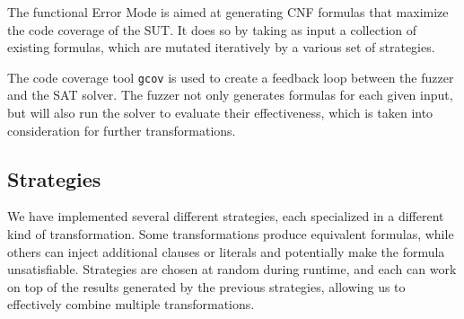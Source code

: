 \documentclass{article}
\begin{document}
The functional Error Mode is aimed at generating CNF formulas that maximize the code coverage of the SUT. 
It does so by taking as input a collection of existing formulas, which are mutated iteratively by a 
various set of strategies.

The code coverage tool \verb|gcov| is used to create a feedback loop between the fuzzer and the SAT solver.
The fuzzer not only generates formulas for each given input, but will also run the solver to evaluate
their effectiveness, which is taken into consideration for further transformations.

\subsection{Strategies}

We have implemented several different strategies, each specialized in a different kind of transformation.
Some transformations produce equivalent formulas, while others can inject additional clauses or literals
and potentially make the formula unsatisfiable.
Strategies are chosen at random during runtime, and each can work on top of the results generated by the
previous strategies, allowing us to effectively combine multiple transformations. 
\end{document}

